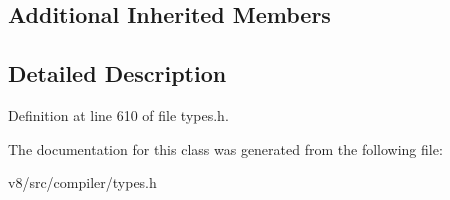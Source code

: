 \subsection*{Additional Inherited Members}


\subsection{Detailed Description}


Definition at line 610 of file types.\+h.



The documentation for this class was generated from the following file\+:\begin{DoxyCompactItemize}
\item 
v8/src/compiler/types.\+h\end{DoxyCompactItemize}
